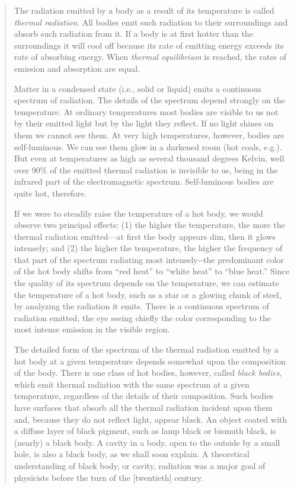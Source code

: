 \begin{quotation}
The radiation emitted by a body as a result of its temperature is called
\emph{thermal radiation}. All bodies emit such radiation to their
surroundings and absorb such radiation from it. If a body is at first
hotter than the surroundings it will cool off because its rate of
emitting energy exceeds its rate of absorbing energy. When \emph{thermal
equilibrium} is reached, the rates of emission and absorption are equal.

Matter in a condensed state (i.e., solid or liquid) emits a continuous
spectrum of radiation. The details of the spectrum depend strongly on
the temperature. At ordinary temperatures most bodies are visible to us
not by their emitted light but by the light they reflect. If no light
shines on them we cannot see them. At very high temperatures, however,
bodies are self-luminous. We can see them glow in a darkened room (hot
coals, e.g.). But even at temperatures as high as several thousand
degrees Kelvin, well over 90\% of the emitted thermal radiation is
invisible to us, being in the infrared part of the electromagnetic
spectrum. Self-luminous bodies are quite hot, therefore.

If we were to steadily raise the temperature of a hot body, we would
observe two principal effects: (1) the higher the temperature, the more
the thermal radiation emitted---at first the body appears dim, then it
glows intensely; and (2) the higher the temperature, the higher the
frequency of that part of the spectrum radiating most intensely-\/-the
predominant color of the hot body shifts from ``red heat'' to ``white
heat'' to ``blue heat.'' Since the quality of its spectrum depends on
the temperature, we can estimate the temperature of a hot body, such as
a star or a glowing chunk of steel, by analyzing the radiation it emits.
There is a continuous spectrum of radiation emitted, the eye seeing
chiefly the color corresponding to the most intense emission in the
visible region.

The detailed form of the spectrum of the thermal radiation emitted by a
hot body at a given temperature depends somewhat upon the composition of
the body. There is one class of hot bodies, however, called \emph{black
bodies}, which emit thermal radiation with the same spectrum at a given
temperature, regardless of the details of their composition. Such bodies
have surfaces that absorb all the thermal radiation incident upon them
and, because they do not reflect light, appear black. An object coated
with a diffuse layer of black pigment, such as lamp black or bismuth
black, is (nearly) a black body. A cavity in a body, open to the outside
by a small hole, is also a black body, as we shall soon explain. A
theoretical understanding of black body, or cavity, radiation was a
major goal of physicists before the turn of the {[}twentieth{]} century.


\end{quotation}
